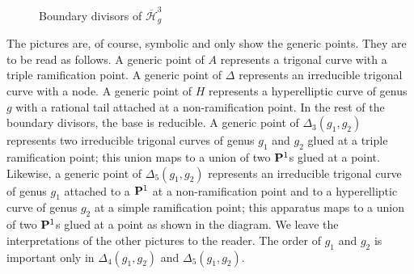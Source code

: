 \documentclass{amsart}
\renewcommand {\P}{{\bf P}}
\newcommand{\orb}[1]{{\mathcal #1}}     %
\renewcommand {\o}[1]{\overline{#1}}
\renewcommand{\o}{\overline}
\begin{document}
\begin{figure}[h]
  \quad
\caption{Boundary divisors of $\o{\orb H}_g^3$}
\label{fig:boundary}
\end{figure}
The pictures are, of course, symbolic and only show the generic points. They are to be read as follows. A generic point of $A$ represents a trigonal curve with a triple ramification point. A generic point of $\Delta$ represents an irreducible trigonal curve with a node. A generic point of $H$ represents a hyperelliptic curve of genus $g$ with a rational tail attached at a non-ramification point. In the rest of the boundary divisors, the base is reducible. A generic point of $\Delta_3(g_1, g_2)$ represents two irreducible trigonal curves of genus $g_1$ and $g_2$ glued at a triple ramification point; this union maps to a union of two $\P^1$s glued at a point. Likewise, a generic point of $\Delta_5(g_1, g_2)$ represents an irreducible trigonal curve of genus $g_1$ attached to a $\P^1$ at a non-ramification point and to a hyperelliptic curve of genus $g_2$ at a simple ramification point; this apparatus maps to a union of two $\P^1$s glued at a point as shown in the diagram. We leave the interpretations of the other pictures to the reader. The order of $g_1$ and $g_2$ is important only in $\Delta_4(g_1,g_2)$ and $\Delta_5(g_1,g_2)$.
\end{document}
